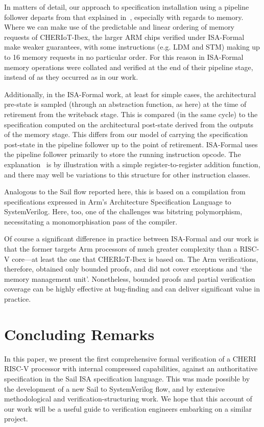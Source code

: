 \documentclass[10pt,conference]{IEEEtran}
\begin{document}
In matters of detail, our approach to specification installation using a
pipeline follower departs from that explained
in~\cite{Reid-2016-EEV}, especially with regards to memory. Where we
can make use of the predictable and linear ordering of memory requests
of CHERIoT-Ibex, the larger ARM chips verified under ISA-Formal make weaker
guarantees, with some instructions (e.g. LDM and STM) making up to 16 memory requests in
no particular order. For this reason in ISA-Formal memory operations were
collated and verified at the end of their pipeline stage, instead of as they
occurred as in our work.

Additionally, in the ISA-Formal work, at least for simple cases, the
architectural pre-state is sampled (through an abstraction function, as here)
at the time of retirement from the writeback stage. This is compared (in the same
cycle) to the specification computed on the architectural post-state derived
from the outputs of the memory stage. This differs from our model of carrying
the specification post-state in the pipeline follower up to the point of retirement.
ISA-Formal uses the pipeline follower primarily to store the running instruction
opcode. The explanation~\cite{Reid-2016-EEV} is
by illustration with a simple register-to-register addition function, and there
may well be variations to this structure for other instruction classes.

Analogous to the Sail flow reported here, this is based on a compilation
from specifications expressed in Arm's Architecture Specification Language
to SystemVerilog. Here, too, one of the challenges was bitstring
polymorphism, necessitating a monomorphisation pass of the compiler.

Of course a significant difference in practice between ISA-Formal and our
work is that the former targets Arm processors of much greater complexity
than a RISC-V core---at least the one that CHERIoT-Ibex is based on. The
Arm verifications, therefore, obtained only bounded proofs, and
did not cover exceptions and `the memory management unit'.  Nonetheless,
bounded proofs and partial verification coverage can be highly effective at
bug-finding and can deliver significant value in practice.

\section{Concluding Remarks}

In this paper, we present the first comprehensive formal verification of a
CHERI RISC-V processor with internal
compressed capabilities, against an authoritative specification in the Sail
ISA specification language. This was made possible by the development of a
new Sail to SystemVerilog flow, and by extensive methodological and
verification-structuring work. We hope that this account of our work will be
a useful guide to verification engineers embarking on a similar project.
\end{document}
